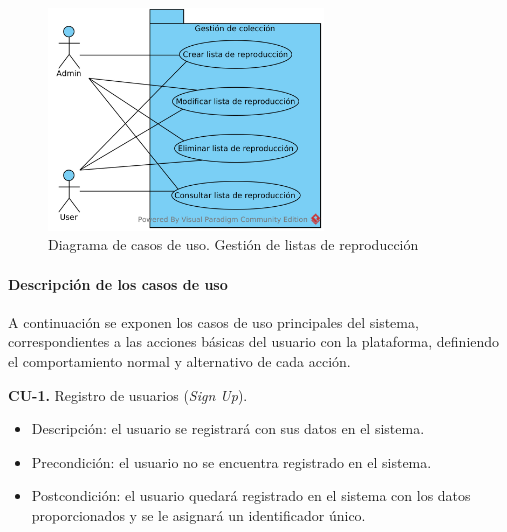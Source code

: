\begin{figure}[H]
  \begin{center}
  \includegraphics[width=0.65\textwidth]{../visual_paradigm_uml/CU-3_Gestion_de_listas_de_reproduccion.png}
  \caption{Diagrama de casos de uso. Gestión de listas de reproducción}
  \label{fig:diag_cu_glr}
  \end{center}
\end{figure}

\paragraph{Descripción de los casos de uso} \mbox{}

A continuación se exponen los casos de uso principales del sistema, correspondientes a las
acciones básicas del usuario con la plataforma, definiendo el comportamiento normal y
alternativo de cada acción.

\textbf{CU-1.} Registro de usuarios (\textit{Sign Up}).
  
\begin{itemize}
    \item Descripción: el usuario se registrará con sus datos en el sistema.
    \item Precondición: el usuario no se encuentra registrado en el sistema.
    \item Postcondición: el usuario quedará registrado en el sistema con los datos proporcionados y se le asignará un identificador único.
\end{itemize}
    
